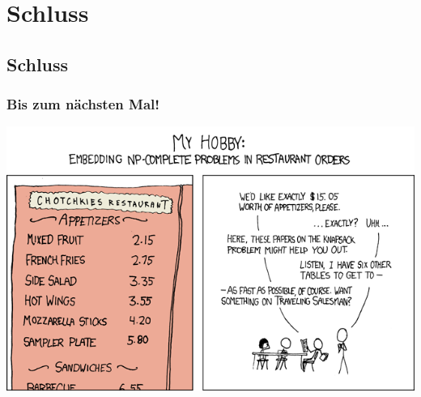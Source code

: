 \section{Schluss}
\subsection{Schluss}
\begin{frame}
\frametitle{Bis zum nächsten Mal!}
\begin{center}
	\includegraphics[scale=5.2]{images/287_np_complete.png}
\end{center}
\end{frame}

